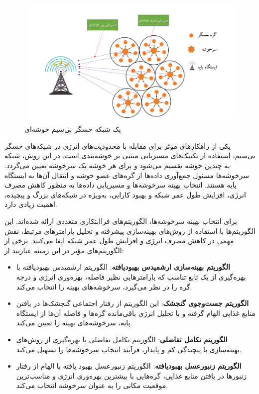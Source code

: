 \documentclass[12pt, onecolumn, a4paper]{article}
\begin{document}
	\begin{figure}[h]
		\centering
		\includegraphics[width=\textwidth]{cluster-persian.png}
		\caption{یک شبکه حسگر بی‌سیم خوشه‌ای}
		\label{fig:your_label}
	\end{figure}
	
	یکی از راهکارهای مؤثر برای مقابله با محدودیت‌های انرژی در شبکه‌های حسگر بی‌سیم، استفاده از تکنیک‌های مسیریابی مبتنی بر خوشه‌بندی است. در این روش، شبکه به چندین خوشه تقسیم می‌شود و برای هر خوشه یک سرخوشه تعیین می‌گردد. سرخوشه‌ها مسئول جمع‌آوری داده‌ها از گره‌های عضو خوشه و انتقال آن‌ها به ایستگاه پایه هستند. انتخاب بهینه سرخوشه‌ها و مسیریابی داده‌ها به منظور کاهش مصرف انرژی، افزایش طول عمر شبکه و بهبود کارایی، به‌ویژه در شبکه‌های بزرگ و پیچیده، اهمیت زیادی دارد.
	
	برای انتخاب بهینه سرخوشه‌ها، الگوریتم‌های فراابتکاری متعددی ارائه شده‌اند. این الگوریتم‌ها با استفاده از روش‌های بهینه‌سازی پیشرفته و تحلیل پارامترهای مرتبط، نقش مهمی در کاهش مصرف انرژی و افزایش طول عمر شبکه ایفا می‌کنند. برخی از الگوریتم‌های مؤثر در این زمینه عبارتند از:
	
	\begin{itemize}
		\item \textbf{الگوریتم بهینه‌سازی ارشمیدس بهبودیافته}:  الگوریتم ارشمیدس بهبودیافته با بهره‌گیری از یک تابع تناسب که پارامترهایی نظیر فاصله، بهره‌وری انرژی و درجه گره را در نظر می‌گیرد، سرخوشه‌های بهینه را انتخاب می‌کند.
		\item \textbf{الگوریتم جست‌وجوی گنجشک}: این الگوریتم از رفتار اجتماعی گنجشک‌ها در یافتن منابع غذایی الهام گرفته و با تحلیل انرژی باقی‌مانده گره‌ها و فاصله آن‌ها از ایستگاه پایه، سرخوشه‌های بهینه را تعیین می‌کند.
		\item \textbf{الگوریتم تکامل تفاضلی}: الگوریتم  تکامل تفاضلی با بهره‌گیری از روش‌های بهینه‌سازی با پیچیدگی کم و پایدار، فرآیند انتخاب سرخوشه‌ها را تسهیل می‌کند.
		\item \textbf{الگوریتم زنبورعسل بهبودیافته}: الگوریتم زنبورعسل بهبود یافته با الهام از رفتار زنبورها در یافتن منابع غذایی، گره‌هایی با بیشترین بهره‌وری انرژی و مناسب‌ترین موقعیت مکانی را به عنوان سرخوشه انتخاب می‌کند.
	\end{itemize}
	
\end{document}
